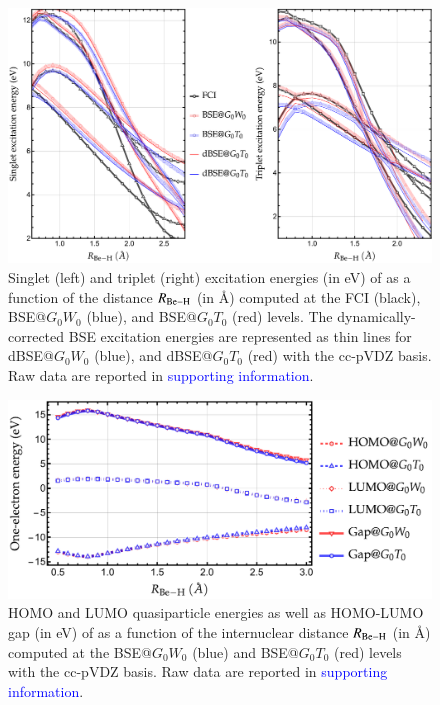\documentclass[aip,jcp,reprint,noshowkeys,superscriptaddress]{revtex4-1}
\newcommand{\SupInf}{\textcolor{blue}{supporting information}}
\begin{document}
\begin{figure}
	\includegraphics[width=\textwidth]{BeH2}
	\caption{Singlet (left) and triplet (right) excitation energies (in \si{\eV}) of  as a function of the distance $R_{\ce{Be-H}}$ (in \si{\angstrom}) computed at the FCI (black), BSE@$G_0W_0$ (blue), and BSE@$G_0T_0$ (red) levels.
	The dynamically-corrected BSE excitation energies are represented as thin lines for dBSE@$G_0W_0$ (blue), and dBSE@$G_0T_0$ (red) with the cc-pVDZ basis.
	Raw data are reported in {\SupInf}.}
	\label{fig:BeH2}
\end{figure}

\begin{figure}
	\includegraphics[width=\linewidth]{BeH2_gap}
	\caption{HOMO and LUMO quasiparticle energies as well as HOMO-LUMO gap (in \si{\eV}) of  as a function of the internuclear distance $R_{\ce{Be-H}}$ (in \si{\angstrom}) computed at the BSE@$G_0W_0$ (blue) and BSE@$G_0T_0$ (red) levels with the cc-pVDZ basis.
	Raw data are reported in {\SupInf}.}
	\label{fig:BeH2_gap}
\end{figure}
\end{document}

